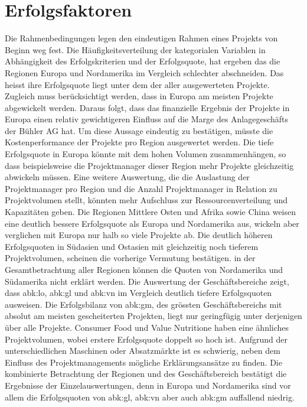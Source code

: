 \section{Erfolgsfaktoren}\label{sec:diskerf}
Die Rahmenbedingungen legen den eindeutigen Rahmen eines Projekts von Beginn weg fest. Die Häufigkeitsverteilung der kategorialen Variablen in Abhängigkeit des Erfolgskriterien und der Erfolgsquote, hat ergeben das die Regionen Europa und Nordamerika im Vergleich schlechter abschneiden. Das heisst ihre Erfolgsquote liegt unter dem der aller ausgewerteten Projekte. Zugleich muss berücksichtigt werden, dass in Europa am meisten Projekte abgewickelt werden. Daraus folgt, dass das finanzielle Ergebnis der Projekte in Europa einen relativ gewichtigeren Einfluss auf die Marge des Anlagegeschäfts der Bühler AG hat. Um diese Aussage eindeutig zu bestätigen, müsste die Kostenperformance der Projekte pro Region ausgewertet werden. Die tiefe Erfolgsquote in Europa könnte mit dem hohen Volumen zusammenhängen, so dass beispielsweise die Projektmanager dieser Region mehr Projekte gleichzeitig abwickeln müssen. Eine weitere Auswertung, die die Auslastung der Projektmanager pro Region und die Anzahl Projektmanager in Relation zu Projektvolumen stellt, könnten mehr Aufschluss zur Ressourcenverteilung und Kapazitäten geben. Die Regionen Mittlere Osten und Afrika sowie China weisen eine deutlich bessere Erfolgsquote als Europa und Nordamerika aus, wickeln aber verglichen mit Europa nur halb so viele Projekte ab. Die deutlich höheren Erfolgsquoten in Südasien und Ostasien mit gleichzeitig noch tieferem Projektvolumen, scheinen die vorherige Vermutung bestätigen. in der Gesamtbetrachtung aller Regionen können die Quoten von Nordamerika und Südamerika nicht erklärt werden. 
\newline Die Auswertung der Geschäftsbereiche zeigt, dass \gls{abk:lo}, \gls{abk:gl} und \gls{abk:vn} im Vergleich deutlich tiefere Erfolgsquoten ausweisen. Die Erfolgsbilanz von \gls{abk:gm}, des grössten Geschäftsbereichs mit absolut am meisten gescheiterten Projekten, liegt nur geringfügig unter derjenigen über alle Projekte. Consumer Food und Value Nutritione haben eine ähnliches Projektvolumen, wobei erstere Erfolgsquote doppelt so hoch ist. Aufgrund der unterschiedlichen Maschinen oder Absatzmärkte ist es schwierig, neben dem Einfluss des Projektmanagements mögliche Erklärungsansätze zu finden.  %
\newline
Die kombinierte Betrachtung der Regionen und des Geschäftsbereich bestätigt die Ergebnisse der Einzelauswertungen, denn in Europa und Nordamerika sind vor allem die Erfolgsquoten von \gls{abk:gl}, \gls{abk:vn} aber auch \gls{abk:gm} auffallend niedrig.
